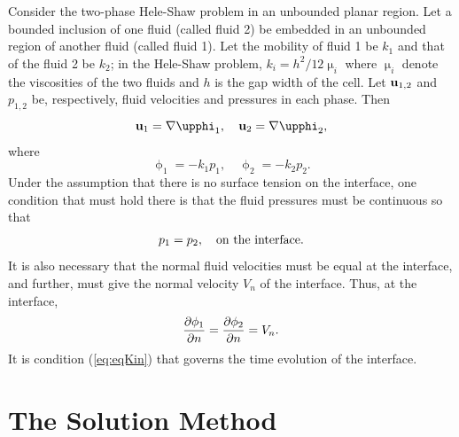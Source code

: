 \documentclass[fleqn]{jleo}
\begin{document}
Consider the two-phase Hele-Shaw problem in an unbounded
planar region. Let a bounded inclusion of one fluid 
(called fluid 2) be embedded in an unbounded region of
another fluid (called fluid 1). Let the mobility of fluid 1
be $k_1$ and that of the fluid 2 be $k_2$;
in the Hele-Shaw problem, $k_i = h^2/12 \upmu_i$ where
$\upmu_i$ denote the viscosities of the two fluids and
$h$ is the gap width of the cell.
Let ${\bf u}_{1,2}$ and $p_{1,2}$ be, respectively,
fluid velocities and pressures in each phase. Then
\begin{equation}
{\bf u}_1 = \nabla \upphi_1,\quad {\bf u}_2 = \nabla \upphi_2,
\end{equation}
where
\begin{equation}
\upphi_1 = - k_1 p_1,\quad \upphi_2=-k_2 p_2.
\end{equation}
Under the assumption that there is no surface tension 
on the interface, one condition that must hold there
is that the fluid pressures must be continuous so that
\begin{equation}
p_1 = p_2,\quad {\rm on\ the \ interface}.
\end{equation}
It is also necessary 
that the normal fluid velocities must be equal at the interface,
and further, must give the normal velocity $V_n$ of the interface. Thus,
at the interface,
\begin{equation}
{\partial \phi_1 \over \partial n} ={\partial \phi_2 \over \partial n} = V_n.\label{eq:eqKin}
\end{equation}
It is condition (\ref{eq:eqKin}) that governs the
time evolution of the interface.

\section{The Solution Method}
\end{document}
